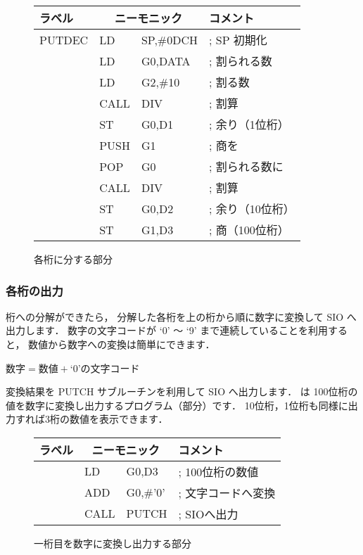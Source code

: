 \begin{figure}[btp]
{\small\tt\begin{center}
\begin{tabular}{|l|l l l|} \hline
ラベル & \multicolumn{2}{|c}{ニーモニック} & コメント    \\
\hline
PUTDEC & LD   & SP,\#0DCH        & ; SP 初期化  \\
       & LD   & G0,DATA          & ; 割られる数     \\
       & LD   & G2,\#10          & ; 割る数         \\
       & CALL & DIV              & ; 割算           \\
       & ST   & G0,D1            & ; 余り（1位桁）  \\
       & PUSH & G1               & ; 商を           \\
       & POP  & G0               & ; 割られる数に   \\
       & CALL & DIV              & ; 割算           \\
       & ST   & G0,D2            & ; 余り（10位桁） \\
       & ST   & G1,D3            & ; 商（100位桁）  \\
\hline
\end{tabular}
\end{center}}
\caption{各桁に分する部分}
\label{fig:chap6:bunkai}
\end{figure}

\subsubsection{各桁の出力}
桁への分解ができたら，
分解した各桁を上の桁から順に数字に変換して SIO へ出力します．
数字の文字コードが `0' 〜 `9' まで連続していることを利用すると，
数値から数字への変換は簡単にできます．

\begin{center}
$数字 = 数値 + $`0'の文字コード
\end{center}

変換結果を PUTCH サブルーチンを利用して SIO へ出力します．
は
100位桁の値を数字に変換し出力するプログラム（部分）です．
10位桁，1位桁も同様に出力すれば3桁の数値を表示できます．

\begin{figure}[btp]
{\small\tt\begin{center}
\begin{tabular}{|l|l l l|} \hline
ラベル & \multicolumn{2}{|c}{ニーモニック} & コメント    \\
\hline
       & LD   & G0,D3            & ; 100位桁の数値      \\
       & ADD  & G0,\#'0'         & ; 文字コードへ変換  \\
       & CALL & PUTCH            & ; SIOへ出力         \\
\hline
\end{tabular}
\end{center}}
\caption{一桁目を数字に変換し出力する部分}
\label{fig:chap6:hitoketa}
\end{figure}

